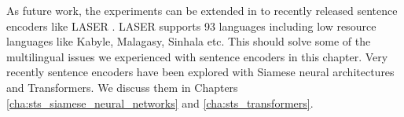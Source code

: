 As future work, the experiments can be extended in to recently released sentence encoders like LASER \cite{10.1162/tacl_a_00288}. LASER supports 93 languages including low resource languages like Kabyle, Malagasy, Sinhala etc. This should solve some of the multilingual issues we experienced with sentence encoders in this chapter. Very recently sentence encoders have been explored with Siamese neural architectures and  Transformers. We discuss them in Chapters \ref{cha:sts_siamese_neural_networks} and \ref{cha:sts_transformers}. 
